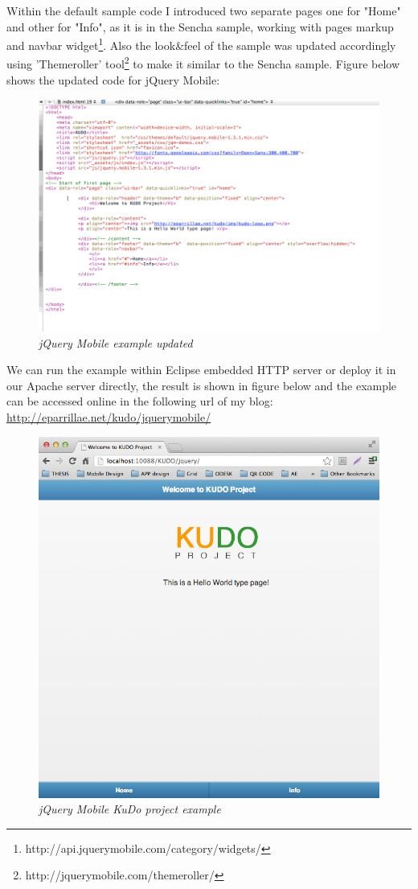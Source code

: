 \documentclass[a4paper,12pt]{book}
\begin{document}
Within the default sample code I introduced two separate pages one for "Home" and other for "Info", as it is in the Sencha sample, working with pages markup and navbar widget\footnote{http://api.jquerymobile.com/category/widgets/}. Also the look\&feel of the sample was updated accordingly using 'Themeroller' tool\footnote{http://jquerymobile.com/themeroller/} to make it similar to the Sencha sample. Figure below shows the updated code for jQuery Mobile:

\begin{figure}[H]
    \centering
    \includegraphics[width=12cm, keepaspectratio]{img/jquery2.png}
    \caption{\textit{jQuery Mobile example updated}}
 \end{figure}

We can run the example within Eclipse embedded HTTP server or deploy it in our Apache server directly, the result is shown in figure below and the example can be accessed online in the following url of my blog:\\ 

\url{http://eparrillae.net/kudo/jquerymobile/}

\begin{figure}[H]
    \centering
    \includegraphics[width=12cm, keepaspectratio]{img/jquery5.png}
    \caption{\textit{jQuery Mobile KuDo project example}}
 \end{figure}
\end{document}
